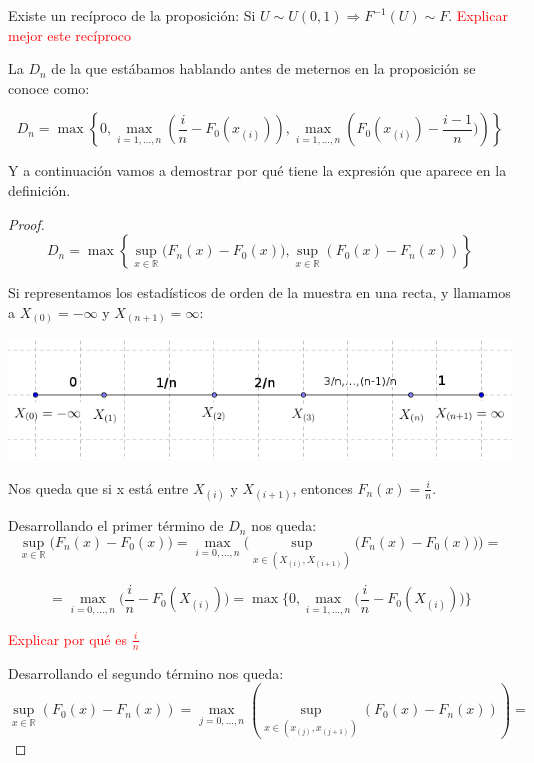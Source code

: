 \documentclass[palatino,nochap]{apuntes}
\begin{document}
\begin{obs}
Existe un recíproco de la proposición: Si $U \sim U(0,1) \Rightarrow F^{-1}(U) \sim F$. \textcolor{red}{Explicar mejor este recíproco}
\end{obs}

La $D_n$ de la que estábamos hablando antes de meternos en la proposición se conoce como:

\begin{defn}
	\[D_n = \max \left\{ 0, \max_{i=1,…,n} \left( \frac{i}{n} - F_0(x_{(i)}) \right), \max_{i=1,…,n} \left(F_0(x_{(i)}) - \frac{i-1}{n})\right) \right\}\]
\end{defn}

Y a continuación vamos a demostrar por qué tiene la expresión que aparece en la definición.
\begin{proof}

$$ D_n = \max \left\{ \sup_{x\in\mathbb{R}} \Big( F_n(x)-F_0(x)\Big), \sup_{x\in\mathbb{R}} \left( F_0(x)-F_n(x)\right) \right\} $$

Si representamos los estadísticos de orden de la muestra en una recta, y llamamos a $X_{(0)}=-\infty$ y $X_{(n+1)}=\infty$:

\includegraphics[scale=0.5]{img/contrasteks2.png}

Nos queda que si x está entre $X_{(i)}$ y $X_{(i+1)}$, entonces $F_n(x)=\frac{i}{n}$.

Desarrollando el primer término de $D_n$ nos queda:
$$ \sup_{x\in\mathbb{R}} \Big( F_n(x)-F_0(x)\Big) = \max_{i=0,...,n} \Bigg(\sup_{x\in(X_{(i)},X_{(i+1)})} \Big( F_n(x)-F_0(x)\Big) \Bigg) = $$

$$ = \max_{i=0,...,n} \Big( \frac{i}{n} - F_0(X_{(i)}) \Big) = \max\Big\{ 0, \max_{i=1,...,n} \Big( \frac{i}{n} - F_0(X_{(i)}) \Big) \Big\}$$

\textcolor{red}{Explicar por qué es $\frac{i}{n}$} %

Desarrollando el segundo término nos queda:
\[\sup_{x∈ℝ}\left( F_0(x) - F_n(x) \right) = \max_{j=0,…,n} \left( \sup_{x∈(x_{(j)},x_{(j+1)})} \left( F_0(x) - F_n(x) \right) \right) =\]


\end{proof}
\end{document}
